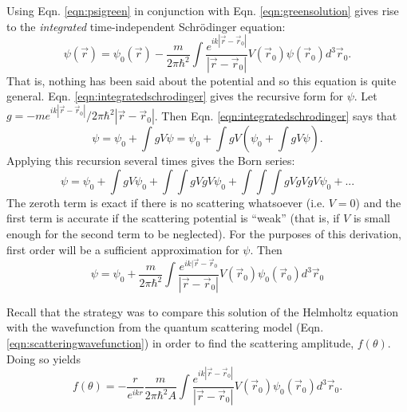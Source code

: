 Using Eqn. \ref{eqn:psigreen} in conjunction with Eqn. \ref{eqn:greensolution} gives rise to the \emph{integrated} time-independent Schr\"{o}dinger equation:
%
\begin{equation} \label{eqn:integratedschrodinger}
\psi(\vec{r})=\psi_0 (\vec{r})-\frac{m}{2\pi\hbar^2}\int\frac{e^{ik|\vec{r}-\vec{r}_0|}}{|\vec{r}-\vec{r}_0|}V(\vec{r}_0)\psi(\vec{r}_0)d^3\vec{r}_0.
\end{equation}
%
That is, nothing has been said about the potential and so this equation is quite general. Eqn. \ref{eqn:integratedschrodinger} gives the recursive form for $\psi$. Let $g=-me^{ik|\vec{r}-\vec{r}_0|}/2\pi\hbar^2|\vec{r}-\vec{r}_0|$. Then Eqn. \ref{eqn:integratedschrodinger} says that
%
\begin{equation} \nonumber
\psi=\psi_0+\int gV\psi = \psi_0+\int gV (\psi_0+\int gV\psi).
\end{equation}
%
Applying this recursion several times gives the Born series:
%
\begin{equation}\nonumber
\psi=\psi_0+\int gV\psi_0+\int \int gVgV\psi_0 + \int \int \int gVgVgV\psi_0 + ...
\end{equation}
%
The zeroth term is exact if there is no scattering whatsoever (i.e. $V=0$) and the first term is accurate if the scattering potential is ``weak'' (that is, if $V$ is small enough for the second term to be neglected). For the purposes of this derivation, first order will be a sufficient approximation for $\psi$. Then
%
\begin{equation} \nonumber
\psi=\psi_0+\frac{m}{2\pi\hbar^2}\int\frac{e^{ik|\vec{r}-\vec{r}_0}}{|\vec{r}-\vec{r}_0|}V(\vec{r}_0)\psi_0(\vec{r}_0) d^3\vec{r}_0
\end{equation}

Recall that the strategy was to compare this solution of the Helmholtz equation with the wavefunction from the quantum scattering model (Eqn. \ref{eqn:scatteringwavefunction}) in order to find the scattering amplitude, $f(\theta)$. Doing so yields
%
\begin{equation} \nonumber
f(\theta)=-\frac{r}{e^{ikr}}\frac{m}{2\pi\hbar^2A}\int\frac{e^{ik|\vec{r}-\vec{r}_0|}}{|\vec{r}-\vec{r}_0|}V(\vec{r}_0)\psi_0(\vec{r}_0)d^3\vec{r}_0.
\end{equation}
%

